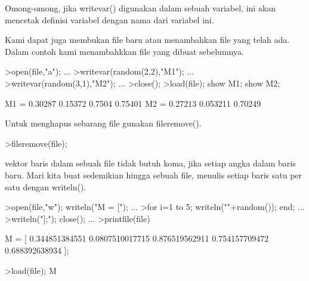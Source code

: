 \documentclass[a4paper,10pt]{article}
\begin{document}
\begin{eulernotebook}
\begin{eulercomment}
\begin{eulercomment}
\begin{eulercomment}
\begin{eulercomment}
\begin{eulercomment}
\begin{eulercomment}
\begin{eulercomment}
Omong-omong, jika writevar() digunakan dalam sebuah variabel, ini akan
mencetak definisi variabel dengan nama dari variabel ini.
\end{eulercomment}
\begin{eulercomment}
Kami dapat juga membukan file baru atau menambahkan file yang telah
ada. Dalam contoh kami menambahkkan file yang dibuat sebelumnya.
\end{eulercomment}
\begin{eulerprompt}
>open(file,"a"); ...
>writevar(random(2,2),"M1"); ...
>writevar(random(3,1),"M2"); ...
>close();
>load(file); show M1; show M2;
\end{eulerprompt}
\begin{euleroutput}
  M1 = 
    0.30287   0.15372 
     0.7504   0.75401 
  M2 = 
    0.27213 
   0.053211 
    0.70249 
\end{euleroutput}
\begin{eulercomment}
Untuk menghapus sebarang file gunakan fileremove().
\end{eulercomment}
\begin{eulerprompt}
>fileremove(file);
\end{eulerprompt}
\begin{eulercomment}
vektor baris dalam sebuah file tidak butuh koma, jika setiap angka
dalam baris baru. Mari kita buat sedemikian hingga sebuah file,
menulis setiap baris satu per satu dengan writeln().
\end{eulercomment}
\begin{eulerprompt}
>open(file,"w"); writeln("M = ["); ...
>for i=1 to 5; writeln(""+random()); end; ...
>writeln("];"); close(); ...
>printfile(file)
\end{eulerprompt}
\begin{euleroutput}
  M = [
  0.344851384551
  0.0807510017715
  0.876519562911
  0.754157709472
  0.688392638934
  ];
\end{euleroutput}
\begin{eulerprompt}
>load(file); M
\end{eulerprompt}
\begin{euleroutput}

\end{euleroutput}
\end{eulercomment}
\end{eulercomment}
\end{eulercomment}
\end{eulercomment}
\end{eulercomment}
\end{eulercomment}
\end{eulernotebook}
\end{document}
